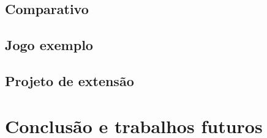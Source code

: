 \documentclass[12pt,twoside,openright,a4paper,english,brazil,sumario=tradicional]{abntex2}
\begin{document}
\section{Comparativo}
\section{Jogo exemplo}
\section{Projeto de extensão}

\chapter{Conclusão e trabalhos futuros}
\label{chap:conclcsao}

\postextual

\end{document}
